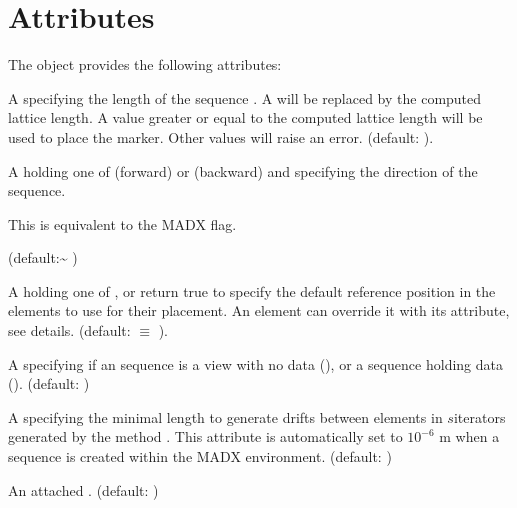 \documentclass[letterpaper,10pt,english]{sphinxmanual}
\begin{document}
\section{Attributes}
\label{\detokenize{sequences:attributes}}
\sphinxAtStartPar
The  object provides the following attributes:
\begin{description}
\sphinxAtStartPar
A  specifying the length of the sequence \sphinxcode{\sphinxupquote{{[}m{]}}}. A  will be replaced by the computed lattice length. A value greater or equal to the computed lattice length will be used to place the  marker. Other values will raise an error. (default: ).

\sphinxAtStartPar
A  holding one of  (forward) or  (backward) and specifying the direction of the sequence. %
\begin{footnote}[1]\sphinxAtStartFootnote
This is equivalent to the MAD\sphinxhyphen{}X  flag.
%
\end{footnote} (default:\textasciitilde{} )

\sphinxAtStartPar
A  holding one of ,  or    return true  to specify the default reference position in the elements to use for their placement. An element can override it with its  attribute, see {\hyperref[\detokenize{sequences:element-positions}]{}} details. (default:  \(\equiv\) ).

\sphinxAtStartPar
A  specifying if an  sequence is a view with no data (), or a sequence holding data (). (default: )

\sphinxAtStartPar
A  specifying the minimal length \sphinxcode{\sphinxupquote{{[}m{]}}} to generate  drifts between elements in \(s\)\sphinxhyphen{}iterators generated by the method . This attribute is automatically set to \(10^{-6}\) m when a sequence is created within the MADX environment. (default: )

\sphinxAtStartPar
An attached . (default: )

\end{description}
\end{document}
